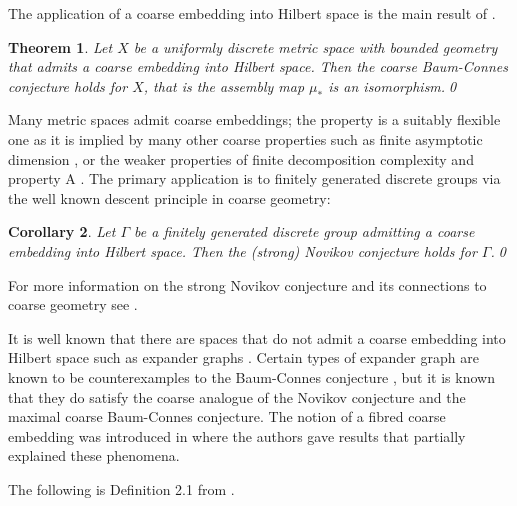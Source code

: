 \documentclass[11pt]{amsart}
\theoremstyle{plain}
\newtheorem{theorem}{Theorem}%
\newtheorem{corollary}[theorem]{Corollary}%
\theoremstyle{definition}%
\theoremstyle{remark}%
\begin{document}
The application of a coarse embedding into Hilbert space is the main result of \cite{MR1728880, MR1905840}.

\begin{theorem}
Let $X$ be a uniformly discrete metric space with bounded geometry that admits a coarse embedding into Hilbert space. Then the coarse Baum-Connes conjecture holds for $X$, that is the assembly map $\mu_{*}$ is an isomorphism.\qed
\end{theorem}

Many metric spaces admit coarse embeddings; the property is a suitably flexible one as it is implied by many other coarse properties such as finite asymptotic dimension \cite{MR1739727}, or the weaker properties of finite decomposition complexity \cite{MR2947546} and property A \cite{MR1728880}. The primary application is to finitely generated discrete groups via the well known descent principle in coarse geometry:

\begin{corollary}
Let $\Gamma$ be a finitely generated discrete group admitting a coarse embedding into Hilbert space. Then the (strong) Novikov conjecture holds for $\Gamma$.\qed
\end{corollary}

For more information on the strong Novikov conjecture and its connections to coarse geometry see \cite{MR1388300, MR1905840}.

It is well known that there are spaces that do not admit a coarse embedding into Hilbert space such as expander graphs \cite{MR2569682}. Certain types of expander graph are known to be counterexamples to the Baum-Connes conjecture \cite{higsonpreprint,MR1911663,explg1,explg2,MR2568691}, but it is known that they do satisfy the coarse analogue of the Novikov conjecture and the maximal coarse Baum-Connes conjecture. The notion of a fibred coarse embedding was introduced in \cite{FCEpaper} where the authors gave results that partially explained these phenomena.

The following is Definition 2.1 from \cite{FCEpaper}.
\end{document}
